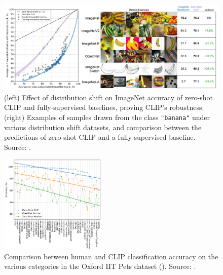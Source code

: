 \documentclass{article}
\begin{document}
\begin{figure}[ht!]
    \begin{center}
        \includegraphics[width=1.0\textwidth]{figures/clip_fig13.png}
    \end{center}
    \caption{
        (left) Effect of distribution shift on ImageNet accuracy of zero-shot CLIP and fully-supervised baselines, proving CLIP's robustness. (right) Examples of samples drawn from the class \texttt{"banana"} under various distribution shift datasets, and comparison between the predictions of zero-shot CLIP and a fully-supervised baseline. Source: \citet{radford2021clip}.
    }
    \label{fig:clip_fig13}
\end{figure}

\begin{figure}
    \centering
    \vspace{-2mm}
    \includegraphics[width=0.45\textwidth]{figures/clip_fig16.png}
    \caption{
        Comparison between human and CLIP classification accuracy on the various categories in the Oxford IIT Pets dataset (\citet{parkhi2012pets}). Source: \citet{radford2021clip}.
    }
    \label{fig:clip_fig16}
    \vspace{-12mm}
\end{figure}
\end{document}
